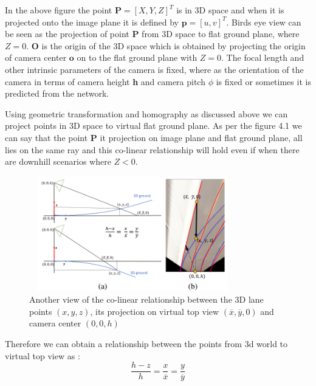    In the above figure the point $\textbf{P} =[X, Y, Z]^{T}$ is in 3D space and when it is projected onto the image plane it is defined by $\textbf{p} = [u, v]^{T}$. Birds eye view can be seen as the projection of point $\textbf{P}$ from 3D space to flat ground plane, where $Z=0$. $\textbf{O}$ is the origin of the 3D space which is obtained by projecting the origin of camera center $\textbf{o}$ on to the flat ground plane with $Z = 0$. The focal length and other intrinsic parameters of the camera is fixed, where as the orientation of the camera in terms of camera height \textbf{h}  and camera pitch \textbf{$\phi$} is fixed or sometimes it is predicted from the network. 
    
    Using geometric transformation and homography as discussed above we can project points in 3D space to virtual flat ground plane. As per the figure 4.1 we can say that the point \textbf{P} it projection on image plane and flat ground plane, all lies on the same ray and this co-linear relationship will hold even if when there are downhill scenarios where $Z<0$. 
    
      \begin{figure}[h]
    \centering
    \includegraphics[width=9cm, height=5cm]{images/collinear_3dlane.png}
    \caption{Another view of the co-linear relationship between the 3D lane points $(x,y,z)$, its projection on virtual top view $(\overline{x}, \overline{y},0)$ and camera center $(0,0,h)$ \cite{guo2020gen}}
    \end{figure}

    Therefore we can obtain a relationship between the points from 3d world to virtual top view as :
    \begin{equation}
        \frac{h-z}{h} =\frac{x}{\overline{x}}=\frac{y}{\overline{y}} 
    \end{equation}
    
